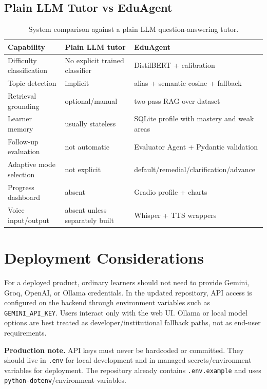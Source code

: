 \documentclass[11pt,a4paper]{article}
\begin{document}
\subsection{Plain LLM Tutor vs EduAgent}


\begin{table}[H]
\centering
\scriptsize
\begin{tabularx}{\textwidth}{>{\raggedright\arraybackslash}p{}Y Y}
\toprule
\textbf{Capability} & \textbf{Plain LLM tutor} & \textbf{EduAgent} \\
\midrule
Difficulty classification & No explicit trained classifier & DistilBERT + calibration \\
Topic detection & implicit & alias + semantic cosine + fallback \\
Retrieval grounding & optional/manual & two-pass RAG over dataset \\
Learner memory & usually stateless & SQLite profile with mastery and weak areas \\
Follow-up evaluation & not automatic & Evaluator Agent + Pydantic validation \\
Adaptive mode selection & not explicit & default/remedial/clarification/advance \\
Progress dashboard & absent & Gradio profile + charts \\
Voice input/output & absent unless separately built & Whisper + TTS wrappers \\
\bottomrule
\end{tabularx}
\caption{System comparison against a plain LLM question-answering tutor.}
\end{table}

\section{Deployment Considerations}

For a deployed product, ordinary learners should not need to provide Gemini, Groq, OpenAI, or Ollama credentials. In the updated repository, API access is configured on the backend through environment variables such as \texttt{GEMINI\_API\_KEY}. Users interact only with the web UI. Ollama or local model options are best treated as developer/institutional fallback paths, not as end-user requirements.

\begin{cautionbox}
\textbf{Production note.} API keys must never be hardcoded or committed. They should live in \texttt{.env} for local development and in managed secrets/environment variables for deployment. The repository already contains \texttt{.env.example} and uses \texttt{python-dotenv}/environment variables.
\end{cautionbox}
\end{document}
